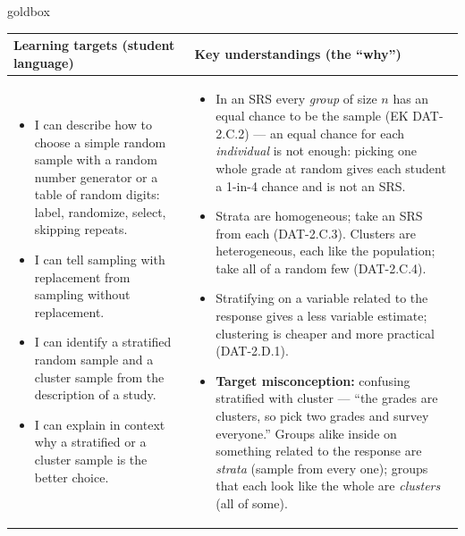 \documentclass[10pt]{article}
\begin{document}
\renewcommand{\arraystretch}{1.4}
\boxguard
\begin{skillbox}{goldbox}
\begin{tabularx}{\linewidth}{@{}X|X@{}}
\textbf{Learning targets (student language)} & \textbf{Key understandings (the ``why'')} \\[2pt]
\hline
\vspace{-6pt}
\begin{itemize}[leftmargin=1.1em, nosep, after=\vspace{2pt}]
  \item I can describe how to choose a simple random sample with a random number generator or
        a table of random digits: label, randomize, select, skipping repeats.
  \item I can tell sampling with replacement from sampling without replacement.
  \item I can identify a stratified random sample and a cluster sample from the description of
        a study.
  \item I can explain in context why a stratified or a cluster sample is the better choice.
\end{itemize}
&
\vspace{-6pt}
\begin{itemize}[leftmargin=1.1em, nosep, after=\vspace{2pt}]
  \item In an SRS every \emph{group} of size $n$ has an equal chance to be the sample (EK
        DAT-2.C.2) --- an equal chance for each \emph{individual} is not enough: picking one
        whole grade at random gives each student a 1-in-4 chance and is not an SRS.
  \item Strata are homogeneous; take an SRS from each (DAT-2.C.3). Clusters are heterogeneous,
        each like the population; take all of a random few (DAT-2.C.4).
  \item Stratifying on a variable related to the response gives a less variable estimate;
        clustering is cheaper and more practical (DAT-2.D.1).
  \item \textbf{Target misconception:} confusing stratified with cluster --- ``the grades are
        clusters, so pick two grades and survey everyone.'' Groups alike inside on something
        related to the response are \emph{strata} (sample from every one); groups that each
        look like the whole are \emph{clusters} (all of some).
\end{itemize}
\end{tabularx}
\end{skillbox}
\end{document}
